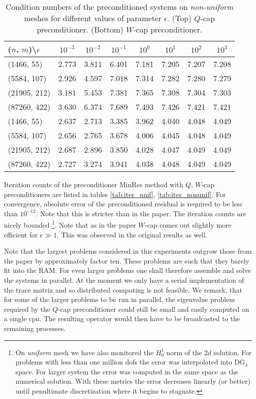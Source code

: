 \documentclass[10pt, a4paper]{article}
\begin{document}
%
\begin{table}[hb]
  \caption{Condition numbers of the preconditioned systems on \textit{non-uniform}
  meshes for different values of parameter $\epsilon$. (Top) $Q$-cap
  preconditioner. (Bottom) $W$-cap preconditioner.
}
\label{tab:cond_Wcap}
\footnotesize{
\begin{tabular}{l|ccccccc}
\hline
($n$, $m$)\textbackslash $\epsilon$ & $10^{-3}$ & $10^{-2}$ & $10^{-1}$ & $10^{0}$ & $10^{1}$ & $10^{2}$ & $10^{3}$\\
\hline
(1466, 55) & 2.773 & 3.811 & 6.401 & 7.181 & 7.205 & 7.207 & 7.208\\
(5584, 107) & 2.926 & 4.597 & 7.018 & 7.314 & 7.282 & 7.280 & 7.279\\
(21905, 212) & 3.181 & 5.453 & 7.381 & 7.365 & 7.308 & 7.304 & 7.303\\
(87260, 422) & 3.630 & 6.374 & 7.689 & 7.493 & 7.426 & 7.421 & 7.421\\
\hline
\hline
(1466, 55) & 2.637 & 2.713 & 3.385 & 3.962 & 4.040 & 4.048 & 4.049\\
(5584, 107) & 2.656 & 2.765 & 3.678 & 4.006 & 4.045 & 4.048 & 4.049\\
(21905, 212) & 2.687 & 2.896 & 3.850 & 4.028 & 4.047 & 4.049 & 4.049\\
(87260, 422) & 2.727 & 3.274 & 3.941 & 4.038 & 4.048 & 4.049 & 4.049\\
\hline
\end{tabular}
}
\end{table}

Iteration counts of the preconditioner MinRes method with $Q$, $W$-cap preconditioners 
are listed in tables \ref{tab:iter_unif}, \ref{tab:iter_nonunif}. For convergence, 
absolute error of the preconditioned residual is required to be less than $10^{-12}$. 
Note that this is stricter than in the paper. The iteration counts are nicely bounded
\footnote{On \textit{uniform} mesh we have also monitored the $H^1_0$ norm of the 2$d$ solution. 
For problems with less than one million dofs the error was interpolated into DG$_4$ 
space. For larger system the error was computed in the same space as the numerical 
solution. With these metrics the error decreases linearly (or better) until penultimate 
discretization where it begins to stagnate.}. Note
that as in the paper $W$-cap comes out slightly more efficient for $\epsilon\gg 1$. 
This was observed in the original results as well.

Note that the largest problems considered in this experiments outgrow those from 
the paper by approximately factor ten. These problems are such that they barely 
fit into the RAM. For even larger problems one shall therefore assemble and solve 
the systems in parallel. At the moment we only have a serial implementation of the 
trace matrix and so distributed computing is not feasible. We remark, that for 
some of the larger problems to be run in parallel, the eigenvalue problem required 
by the $Q$-cap preconditioner could still be small and easily computed on a single 
cpu. The resulting operator would then have to be broadcasted to the 
remaining processes.
\end{document}
